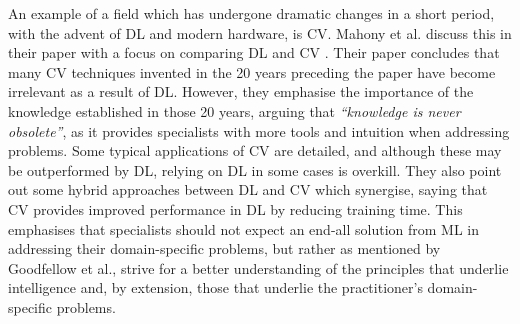 An example of a field which has undergone dramatic changes in a short period, with the advent of \gls{DL} and modern hardware, is \gls{CV}. Mahony et al. discuss this in their paper with a focus on comparing \gls{DL} and \gls{CV} \cite{Mahony-et-al-2020}. Their paper concludes that many \gls{CV} techniques invented in the 20 years preceding the paper have become irrelevant as a result of \gls{DL}. However, they emphasise the importance of the knowledge established in those 20 years, arguing that \textit{``knowledge is never obsolete''}, as it provides specialists with more tools and intuition when addressing problems. Some typical applications of \gls{CV} are detailed, and although these may be outperformed by \gls{DL}, relying on \gls{DL} in some cases is overkill. They also point out some hybrid approaches between \gls{DL} and \gls{CV} which synergise, saying that \gls{CV} provides improved performance in \gls{DL} by reducing training time. This emphasises that specialists should not expect an end-all solution from \gls{ML} in addressing their domain-specific problems, but rather as mentioned by Goodfellow et al., strive for a better understanding of the principles that underlie intelligence and, by extension, those that underlie the practitioner's domain-specific problems.

